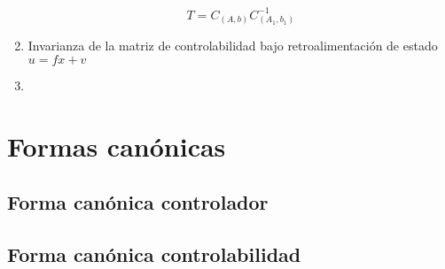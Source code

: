 \begin{enumerate}
                \begin{equation}
                    T = C_{(A, b)} C_{(A_1, b_1)}^{-1}
                \end{equation}

            \item Invarianza de la matriz de controlabilidad bajo retroalimentación de estado $u = f x + v$

            \item
        \end{enumerate}

    \section{Formas canónicas}
        \subsection{Forma canónica controlador}
        \subsection{Forma canónica controlabilidad}
